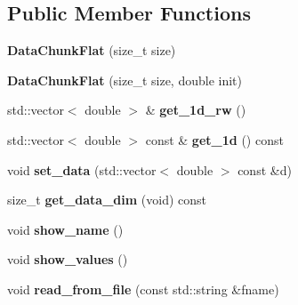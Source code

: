 \subsection*{Public Member Functions}
\begin{DoxyCompactItemize}
\item 
\mbox{\label{classkeras_1_1_data_chunk_flat_a23e7ce058e74126bb5c05fd4565c5109}} 
{\bfseries Data\+Chunk\+Flat} (size\+\_\+t size)
\item 
\mbox{\label{classkeras_1_1_data_chunk_flat_a5b68ee40c3a924fc0e1f0b7a6680284d}} 
{\bfseries Data\+Chunk\+Flat} (size\+\_\+t size, double init)
\item 
\mbox{\label{classkeras_1_1_data_chunk_flat_ab63f6f87062845bd925a1084b6a979cb}} 
std\+::vector$<$ double $>$ \& {\bfseries get\+\_\+1d\+\_\+rw} ()
\item 
\mbox{\label{classkeras_1_1_data_chunk_flat_addd6d7496d4d2951339a951d54e34173}} 
std\+::vector$<$ double $>$ const  \& {\bfseries get\+\_\+1d} () const
\item 
\mbox{\label{classkeras_1_1_data_chunk_flat_a7b245c82d49a18fc97b9e20617e958eb}} 
void {\bfseries set\+\_\+data} (std\+::vector$<$ double $>$ const \&d)
\item 
\mbox{\label{classkeras_1_1_data_chunk_flat_a25bf93e891e64177aa37442780d60078}} 
size\+\_\+t {\bfseries get\+\_\+data\+\_\+dim} (void) const
\item 
\mbox{\label{classkeras_1_1_data_chunk_flat_a50af23bf504327b7c6d3cd0c03c9d81e}} 
void {\bfseries show\+\_\+name} ()
\item 
\mbox{\label{classkeras_1_1_data_chunk_flat_ac1d2d2160dae753e49691531993c42e2}} 
void {\bfseries show\+\_\+values} ()
\item 
\mbox{\label{classkeras_1_1_data_chunk_flat_a7ce6915fd2100c555568c00620f74d04}} 
void {\bfseries read\+\_\+from\+\_\+file} (const std\+::string \&fname)
\end{DoxyCompactItemize}
